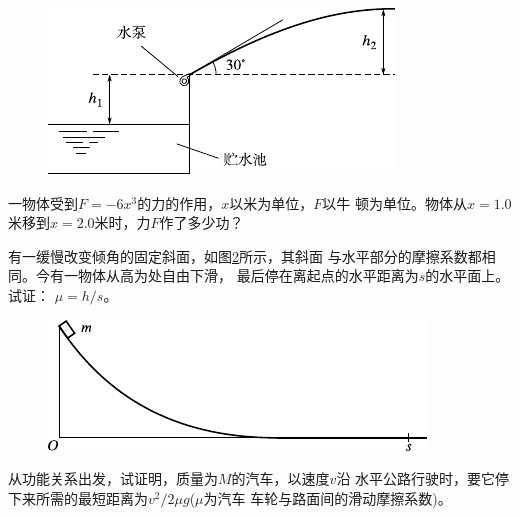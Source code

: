 \begin{exercises}
\begin{figure}[h]
  \centering
  \includegraphics{figure/fig06.16}
  \caption{}
  \label{fig:06.16}
\end{figure}

\exercise 一物体受到$ F = - 6 x ^ { 3 } $的力的作用，$ x $以米为单位，$ F $以牛
顿为单位。物体从$ x = 1.0 $米移到$ x = 2.0 $米时，力$ F $作了多少功？

\clearpage
\exercise 有一缓慢改变倾角的固定斜面，如图\ref{fig:06.17}\;所示，其斜面
与水平部分的摩擦系数都相同。今有一物体从高为处自由下滑，
最后停在离起点的水平距离为$ s $的水平面上。试证： $ \mu = h / s $。
\begin{figure}[h]
  \centering
  \includegraphics{figure/fig06.17}
  \caption{}
  \label{fig:06.17}
\end{figure}

\exercise 从功能关系出发，试证明，质量为$ M $的汽车，以速度$ v $沿
水平公路行驶时，要它停下来所需的最短距离为$ v ^ { 2 } / 2 \mu g $($ \mu $为汽车
车轮与路面间的滑动摩擦系数)。


\end{exercises}
